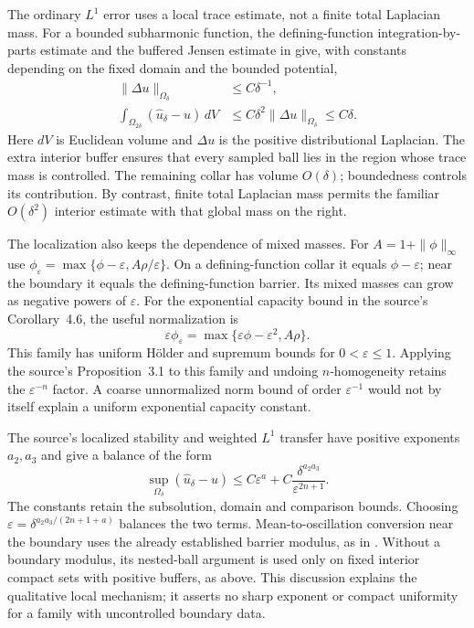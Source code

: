 The ordinary $L^1$ error uses a local trace estimate, not a finite
total Laplacian mass. For a bounded subharmonic function, the
defining-function integration-by-parts estimate and the buffered
Jensen estimate in \cite[Lemma~4.10]{Nguyen20HolderSubsolutionIIPublished}
give, with constants depending on the fixed domain and the
bounded potential,
\[
\tag{68.23dk}\label{eq:ytd-boundary-buffered-jensen}
 \begin{aligned}
  \|\Delta u\|_{\Omega_\delta}&\leq C\delta^{-1},\\
  \int_{\Omega_{2\delta}}(\widehat u_\delta-u)\,dV
       &\leq C\delta^2\|\Delta u\|_{\Omega_\delta}
        \leq C\delta.
 \end{aligned}
\]
Here $dV$ is Euclidean volume and $\Delta u$ is the positive
distributional Laplacian. The extra interior buffer ensures
that every sampled ball lies in the region whose trace mass
is controlled. The remaining collar has volume $O(\delta)$;
boundedness controls its contribution. By contrast, finite
total Laplacian mass permits the familiar $O(\delta^2)$ interior
estimate with that global mass on the right.

The localization also keeps the dependence of mixed masses.
For $A=1+\|\phi\|_\infty$ use
$\phi_\varepsilon=\max\{\phi-\varepsilon,A\rho/\varepsilon\}$.
On a defining-function collar it equals $\phi-\varepsilon$;
near the boundary it equals the defining-function barrier.
Its mixed masses can grow as negative powers of $\varepsilon$.
For the exponential capacity bound in the source's
Corollary~4.6, the useful normalization is
\[
 \varepsilon\phi_\varepsilon
       =\max\{\varepsilon\phi-\varepsilon^2,A\rho\}.
\]
This family has uniform H\"older and supremum bounds for
$0<\varepsilon\leq1$. Applying the source's Proposition~3.1
to this family and undoing $n$-homogeneity retains the
$\varepsilon^{-n}$ factor. A coarse unnormalized norm bound
of order $\varepsilon^{-1}$ would not by itself explain a
uniform exponential capacity constant.

The source's localized stability and weighted $L^1$ transfer
have positive exponents $a_2,a_3$ and give a balance of the form
\[
\tag{68.23dl}\label{eq:ytd-boundary-localized-balance}
 \sup_{\Omega_\delta}(\widehat u_\delta-u)
   \leq C\varepsilon^a
       +C\frac{\delta^{a_2a_3}}{\varepsilon^{2n+1}}.
\]
The constants retain the subsolution, domain and comparison
bounds. Choosing $\varepsilon=
\delta^{a_2a_3/(2n+1+a)}$ balances the two terms.
Mean-to-oscillation conversion near the boundary uses the
already established barrier modulus, as in
\cite[Theorem~3.2]{Zeriahi20ModulusV1}. Without a boundary
modulus, its nested-ball argument is used only on fixed
interior compact sets with positive buffers, as above.
This discussion explains the qualitative local mechanism;
it asserts no sharp exponent or compact uniformity for a
family with uncontrolled boundary data.

